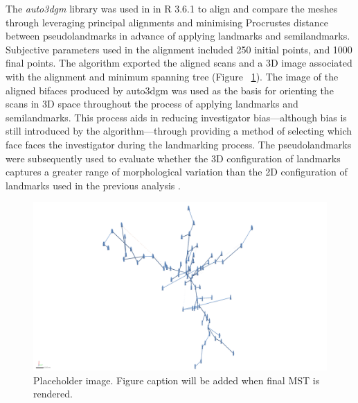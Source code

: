 \documentclass[review]{elsarticle}
\begin{document}
The \textit{auto3dgm} library \citep{RN20822} was used in in R 3.6.1 \citep{R} to align and compare the meshes through leveraging principal alignments and minimising Procrustes distance between pseudolandmarks in advance of applying landmarks and semilandmarks. Subjective parameters used in the alignment included 250 initial points, and 1000 final points. The algorithm exported the aligned scans and a 3D image associated with the alignment and minimum spanning tree (Figure ~\ref{fig:fig4}). The image of the aligned bifaces produced by auto3dgm was used as the basis for orienting the scans in 3D space throughout the process of applying landmarks and semilandmarks. This process aids in reducing investigator bias---although bias is still introduced by the algorithm---through providing a method of selecting which face faces the investigator during the landmarking process. The pseudolandmarks were subsequently used to evaluate whether the 3D configuration of landmarks captures a greater range of morphological variation than the 2D configuration of landmarks used in the previous analysis \citep{RN11783}.

\begin{figure}[ht]\centering
\includegraphics[width=\linewidth]{fig04}
\caption{Placeholder image. Figure caption will be added when final MST is rendered.}
\label{fig:fig4}
\end{figure}
\end{document}
